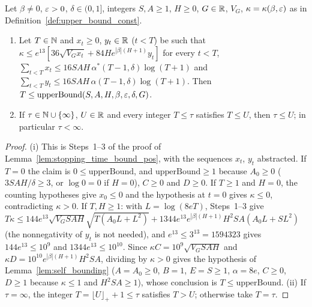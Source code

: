 \begin{lemma}\label{lem:pos_core_stopping_time}
\leanok
{}
Let $\beta \ne 0$, $\varepsilon > 0$, $\delta \in (0, 1]$, integers $S, A \ge 1$, $H \ge 0$, $G \in \mathbb{R}$, $V_G$, $\kappa = \kappa(\beta, \varepsilon)$ as in
Definition~\ref{def:upper_bound_const}.
\begin{enumerate}
  \item[(i)] Let $T \in \mathbb{N}$ and $x_t \ge 0$, $y_t \in \mathbb{R}$ ($t < T$) be such that
  $\kappa \le e^{13}[36\sqrt{V_Gx_t} + 84He^{|\beta|(H+1)}y_t]$ for every $t < T$,
  $\sum_{t<T}x_t \le 16SAH\,\alpha^*(T-1,\delta)\log(T+1)$ and $\sum_{t<T}y_t \le 16SAH\,\alpha(T-1,\delta)\log(T+1)$.
  Then $T \le \mathrm{upperBound}(S, A, H, \beta, \varepsilon, \delta, G)$.
  \item[(ii)] If $\tau \in \mathbb{N} \cup \{\infty\}$, $U \in \mathbb{R}$ and every integer $T \le \tau$ satisfies $T \le U$, then
  $\tau \le U$; in particular $\tau < \infty$.
\end{enumerate}
\end{lemma}

\begin{proof}
\leanok
(i) This is Steps~1--3 of the proof of Lemma~\ref{lem:stopping_time_bound_pos}, with the sequences
$x_t$, $y_t$ abstracted. If $T = 0$ the claim is $0 \le \mathrm{upperBound}$, and $\mathrm{upperBound} \ge 1$
because $A_0 \ge 0$ ($3SAH/\delta \ge 3$, or $\log 0 = 0$ if $H = 0$), $C \ge 0$ and $D \ge 0$. If $T \ge 1$ and
$H = 0$, the counting hypotheses give $x_0 \le 0$ and the hypothesis at $t = 0$ gives $\kappa \le 0$,
contradicting $\kappa > 0$. If $T, H \ge 1$: with $L = \log(8eT)$, Steps~1--3 give
$T\kappa \le 144e^{13}\sqrt{V_GSAH}\sqrt{T(A_0L + L^2)} + 1344e^{13}e^{|\beta|(H+1)}H^2SA(A_0L + SL^2)$
(the nonnegativity of $y_t$ is not needed), and $e^{13} \le 3^{13} = 1594323$ gives
$144e^{13} \le 10^9$ and $1344e^{13} \le 10^{10}$. Since $\kappa C = 10^9\sqrt{V_GSAH}$ and
$\kappa D = 10^{10}e^{|\beta|(H+1)}H^2SA$, dividing by $\kappa > 0$ gives the hypothesis of
Lemma~\ref{lem:self_bounding} ($A = A_0 \ge 0$, $B = 1$, $E = S \ge 1$, $\alpha = 8e$, $C \ge 0$, $D \ge 1$ because
$\kappa \le 1$ and $H^2SA \ge 1$), whose conclusion is $T \le \mathrm{upperBound}$.
(ii) If $\tau = \infty$, the integer $T = \lfloor U\rfloor_+ + 1 \le \tau$ satisfies $T > U$; otherwise take $T = \tau$.
\end{proof}

